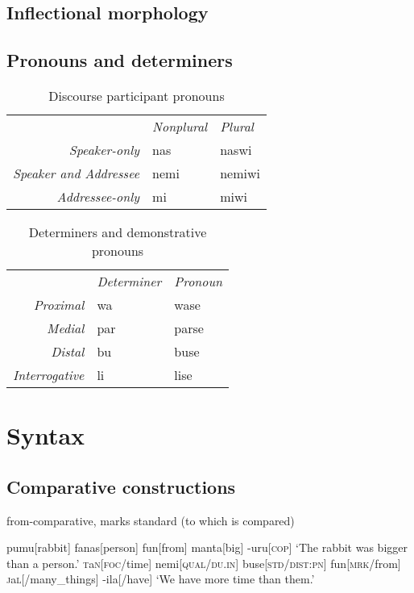 \documentclass[a4paper,10pt,twoside,openright,draft]{memoir}
\begin{document}
\section{Inflectional morphology}
\section{Pronouns and determiners}

\begin{table}[ht]
    \centering
    \begin{tabular}{rll}
        & \textit{Nonplural} & \textit{Plural} \\
    \textit{Speaker-only} & nas & naswi \\
    \textit{Speaker and Addressee} & nemi & nemiwi \\
    \textit{Addressee-only} & mi & miwi \\
    \end{tabular}
    \caption{Discourse participant pronouns}
    \label{tab:firstandsecond}
\end{table}

\begin{table}[ht]
    \centering
    \begin{tabular}{>{\em}rll}
        & \textit{Determiner} & \textit{Pronoun}  \\
    Proximal & wa & wase \\
    Medial & par & parse \\
    Distal & bu & buse \\
    Interrogative & li & lise \\
    \end{tabular}
    \caption{Determiners and demonstrative pronouns}
    \label{tab:determiners}
\end{table}

\chapter{Syntax}

\section{Comparative constructions}

from-comparative, marks standard (to which is compared)

\pex[interpartskip=3ex]
\a
\begingl
pumu[rabbit]
fanas[person]
fun[from]
manta[big]
-uru[\textsc{cop}]
\glft `The rabbit was bigger than a person.'
\endgl
\a
\begingl
\textsc{t}a\textsc{n}[\textsc{foc}/time]
nemi[\textsc{qual}/\textsc{du.in}]
buse[\textsc{std}/\textsc{dist:pn}]
fun[\textsc{mrk}/from]
\textsc{j}a\textsc{l}[/many\_things]
-ila[/have]
\glft `We have more time than them.'
\endgl
\xe
\end{document}
